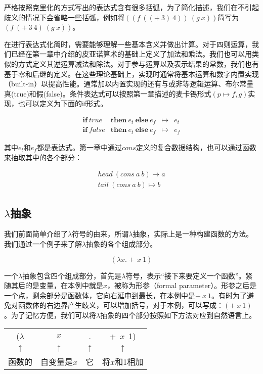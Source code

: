 \documentclass{article}
\begin{document}
严格按照克里化的方式写出的表达式含有很多括弧，为了简化描述，我们在不引起歧义的情况下会省略一些括弧，例如将$((f\ ((+\ 3)\ 4))\ (g\ x))$简写为$(f\ (+\ 3\ 4)\ (g\ x))$。

在进行表达式化简时，需要能够理解一些基本含义并做出计算。对于四则运算，我们已经在第一章中介绍的皮亚诺算术的基础上定义了加法和乘法。我们也可以用类似的方式定义其逆运算减法和除法。对于参与运算以及表示结果的常数，我们也有基于零和后继的定义。在这些理论基础上，实现时通常将基本运算和数字内置实现（built-in）以提高性能。通常加以内置实现的还有与或非等逻辑运算、布尔常量真(true)和假(false)。条件表达式可以按照第一章描述的麦卡锡形式$(p \mapsto f, g)$实现，也可以定义为下面的if形式。

\[
\begin{array}{llcl}
\textbf{if}\ true\! & \textbf{then}\ e_t\ \textbf{else}\ e_f & \mapsto & e_t \\
\textbf{if}\ false\! & \textbf{then}\ e_t\ \textbf{else}\ e_f & \mapsto & e_f
\end{array}
\]

其中$e_t$和$e_f$都是表达式。第一章中通过$cons$定义的复合数据结构，也可以通过函数来抽取其中的各个部分：

\[
\begin{array}{l}
head\ (cons\ a\ b) \mapsto a \\
tail\ (cons\ a\ b) \mapsto b
\end{array}
\]

\subsection{$\lambda$抽象}

我们前面简单介绍了$\lambda$符号的由来，所谓$\lambda$抽象，实际上是一种构建函数的方法。我们通过一个例子来了解$\lambda$抽象的各个组成部分。

\[
(\lambda x . +\ x\ 1)
\]

一个$\lambda$抽象包含四个组成部分，首先是$\lambda$符号，表示“接下来要定义一个函数”。紧随其后的是变量，在本例中就是$x$，被称为形参（formal parameter）。形参之后是一个点，剩余部分是函数体，它向右延申到最长，在本例中是$+\ x\ 1$。有时为了避免对函数体的右边界产生歧义，可以增加括号，对于本例，可以写成：$(+\ x\ 1)$。为了记忆方便，我们可以将$\lambda$抽象的四个部分按照如下方法对应到自然语言上。

\begin{tabular}{cccc}
($\lambda$ & $x$ & . & +\  $x$\ 1) \\
$\uparrow$ & $\uparrow$ & $\uparrow$ & $\uparrow$ \\
函数的 & 自变量是$x$ & 它 & 将$x$和1相加 \\
\end{tabular}
\end{document}
